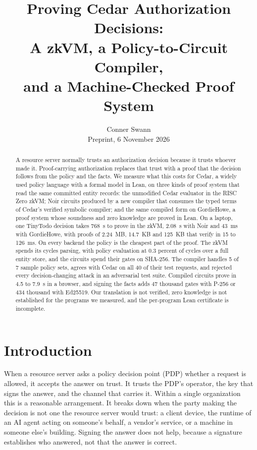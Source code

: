 \documentclass[11pt]{article}
\title{\textbf{Proving Cedar Authorization Decisions:}\\[2pt]
\Large A zkVM, a Policy-to-Circuit Compiler,\\
and a Machine-Checked Proof System}
\author{Conner Swann\\[2pt]
\small Preprint, 6 November 2026}
\date{}
\begin{document}
\maketitle

\begin{abstract}
\noindent
A resource server normally trusts an authorization decision because it trusts whoever made it. Proof-carrying authorization replaces that trust with a proof that the decision follows from the policy and the facts. We measure what this costs for Cedar, a widely used policy language with a formal model in Lean, on three kinds of proof system that read the same committed entity records: the unmodified Cedar evaluator in the RISC Zero zkVM; Noir circuits produced by a new compiler that consumes the typed terms of Cedar's verified symbolic compiler; and the same compiled form on GordieHowe, a proof system whose soundness and zero knowledge are proved in Lean. On a laptop, one TinyTodo decision takes 768~s to prove in the zkVM, 2.08~s with Noir and 43~ms with GordieHowe, with proofs of 2.24~MB, 14.7~KB and 125~KB that verify in 15 to 126~ms. On every backend the policy is the cheapest part of the proof. The zkVM spends its cycles parsing, with policy evaluation at 0.3 percent of cycles over a full entity store, and the circuits spend their gates on SHA-256. The compiler handles 5 of 7 sample policy sets, agrees with Cedar on all 40 of their test requests, and rejected every decision-changing attack in an adversarial test suite. Compiled circuits prove in 4.5 to 7.9~s in a browser, and signing the facts adds 47 thousand gates with P-256 or 434 thousand with Ed25519. Our translation is not verified, zero knowledge is not established for the programs we measured, and the per-program Lean certificate is incomplete.
\end{abstract}

\section{Introduction}

When a resource server asks a policy decision point (PDP) whether a request is allowed, it accepts the answer on trust. It trusts the PDP's operator, the key that signs the answer, and the channel that carries it. Within a single organization this is a reasonable arrangement. It breaks down when the party making the decision is not one the resource server would trust: a client device, the runtime of an AI agent acting on someone's behalf, a vendor's service, or a machine in someone else's building. Signing the answer does not help, because a signature establishes who answered, not that the answer is correct.
\end{document}
